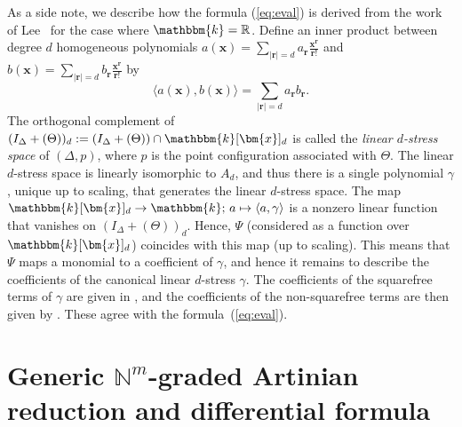 \begin{rema}
As a side note, we describe how the formula (\ref{eq:eval}) is derived from the work of Lee~\cite{Lee} for the case where $\mathbbm{k}=\mathbb{R}$.
Define an inner product between degree $d$ homogeneous polynomials $a(\bm{x})=\sum_{|\bm{r}|=d} a_{\bm{r}} \frac{\bm{x}^{\bm{r}}}{\bm{r}!}$ and $b(\bm{x})=\sum_{|\bm{r}|=d} b_{\bm{r}} \frac{\bm{x}^{\bm{r}}}{\bm{r}!}$ by
\begin{equation*}
\langle a(\bm{x}), b(\bm{x}) \rangle = \sum_{|\bm{r}|=d} a_{\bm{r}}b_{\bm{r}}.
\end{equation*}
The orthogonal complement of $(I_\Delta + (\Theta))_d :=(I_\Delta + (\Theta)) \cap \mathbbm{k}[\bm{x}]_d$ is called the \emph{linear $d$-stress space} of $(\Delta,p)$, where $p$ is the point configuration associated with $\Theta$.
The linear $d$-stress space is linearly isomorphic to $A_d$, and thus there is a single polynomial $\gamma$, unique up to scaling, that generates the linear $d$-stress space.
The map $\mathbbm{k}[\bm{x}]_d \rightarrow \mathbbm{k}; \, a \mapsto \langle a,\gamma \rangle$ is a nonzero linear function that vanishes on $(I_\Delta + (\Theta))_d$. 
Hence, $\Psi$ (considered as a function over $\mathbbm{k}[\bm{x}]_d$) coincides with this map (up to scaling).
This means that $\Psi$ maps a monomial to a coefficient of $\gamma$, and hence it remains to describe the coefficients of the canonical linear $d$-stress $\gamma$.
The coefficients of the squarefree terms of $\gamma$ are given in \cite[Proof of Theorem 14]{Lee}, and the coefficients of the non-squarefree terms are then given by \cite[Theorem 11]{Lee}. These agree with the formula~(\ref{eq:eval}).
\end{rema}


\section{Generic \texorpdfstring{$\mathbb{N}^m$}{N\^{}m}-graded Artinian reduction and differential formula}
